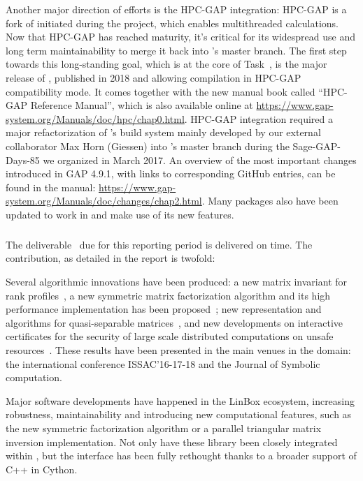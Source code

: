 Another major direction of efforts is the HPC-GAP integration:
HPC-GAP is a fork of \GAP initiated during the \scienceproject project, which
enables multithreaded calculations. Now that HPC-GAP has reached
maturity, it's critical for its widespread use and long term
maintainability to merge it back into \GAP's master branch.
The first step towards this long-standing goal, which is at the core of
Task~, is the major release of , published in 2018 and allowing compilation in HPC-GAP
compatibility mode. It comes together with the new manual book called ``HPC-GAP Reference Manual'',
which is also available online at \url{https://www.gap-system.org/Manuals/doc/hpc/chap0.html}.
HPC-GAP integration required a major
refactorization of \GAP's build system
mainly developed by our external collaborator Max Horn (Giessen) into \GAP's master
branch during the Sage-GAP-Days-85 we organized in March 2017. 
An overview of the most important changes introduced in GAP 4.9.1,
with links to corresponding GitHub entries,
can be found in the \GAP manual: \url{https://www.gap-system.org/Manuals/doc/changes/chap2.html}.
Many \GAP packages also have been updated to work in  and make use of its new features.

\subparagraph{}

The deliverable~ due for this reporting period is
delivered on time. The contribution, as detailed in the report is twofold:
\begin{compactitem}
\item Several algorithmic innovations have been produced: a new matrix invariant
  for rank profiles~\cite{DumPerSul:fcrpmgbd16}, a new symmetric matrix
  factorization algorithm and its high performance implementation has been
  proposed~\cite{DuPe18}; new representation and algorithms for quasi-separable
  matrices~\cite{Pernet:cqm16,PerSto:tsegqm17}, and new developments on 
  interactive certificates for the security of large scale distributed
  computations on unsafe
  resources~\cite{DumKalTho:lticmpdsm16,DumLucPer:cftearp17}. These results have been
  presented in the main venues in the domain:
  the international conference ISSAC'16-17-18 and the Journal of Symbolic computation.
\item Major software developments have happened in the LinBox ecosystem, increasing
  robustness, maintainability and introducing new computational features, such
  as the new symmetric factorization algorithm or a parallel triangular matrix
  inversion implementation. Not only have these library been closely integrated
  within \Sage, but the interface has been fully rethought thanks to a broader
  support of C++ in Cython.
\end{compactitem}


